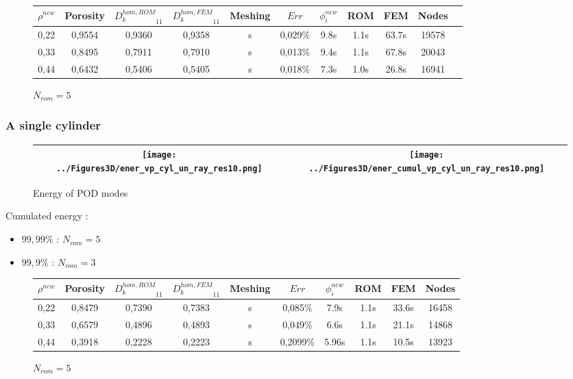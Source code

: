 \begin{figure}[H]%
%
\begin{center}
\begin{tabular}{|c|c||c|c||c||c|c||c|c||c||c|}
\hline
$\rho^{new}$&Porosity&${D_k^{hom,ROM}}_{11}$&${D_k^{hom,FEM}}_{11}$&Meshing&$Err$&$\phi_i^{new}$&ROM&FEM&Nodes\\
\hline
0,22&0,9554&0,9360&0,9358&s&0,029\%&9.8s&1.1s&63.7s&19578\\
\hline
0,33&0,8495&0,7911&0,7910&s&0,013\%&9.4s&1.1s&67.8s&20043\\
\hline
0,44&0,6432&0,5406&0,5405&s&0,018\%&7.3s&1.0s&26.8s&16941\\
\hline
\end{tabular}
\end{center}
\caption{$N_{rom}=5$}
%
\end{figure}

\subsubsection{A single cylinder}

\begin{figure}[H]
\begin{center}
\begin{tabular}{|c|c|}
\hline
\texttt{[image: ../Figures3D/ener\_vp\_cyl\_un\_ray\_res10.png]}
&%
\texttt{[image: ../Figures3D/ener\_cumul\_vp\_cyl\_un\_ray\_res10.png]}
\\ \hline
\end{tabular}
\end{center}
\caption{Energy of POD modes}
\end{figure}

\begin{multicols}{2}
Cumulated energy :

\columnbreak
\begin{itemize}
\item $99,99\%$ : $N_{rom}=5$
\item $99,9\%$ : $N_{rom}=3$
\end{itemize}
%
\end{multicols}

\ligneinter

\begin{figure}[H]%
%
\begin{center}
\begin{tabular}{|c|c||c|c||c|c||c|c||c||c|}
\hline
$\rho^{new}$&Porosity&${D_k^{hom,ROM}}_{11}$&${D_k^{hom,FEM}}_{11}$&Meshing&$Err$&$\phi_i^{new}$&ROM&FEM&Nodes\\
\hline
0,22&0,8479&0,7390&0,7383&s&0,085\%&7.9s&1.1s&33.6s&16458\\
\hline
0,33&0,6579&0,4896&0,4893&s&0,049\%&6.6s&1.1s&21.1s&14868\\
\hline
0,44&0,3918&0,2228&0,2223&s&0,2099\%&5.96s&1.1s&10.5s&13923\\
\hline
\end{tabular}
\end{center}
\caption{$N_{rom}=5$}
%
\end{figure}

